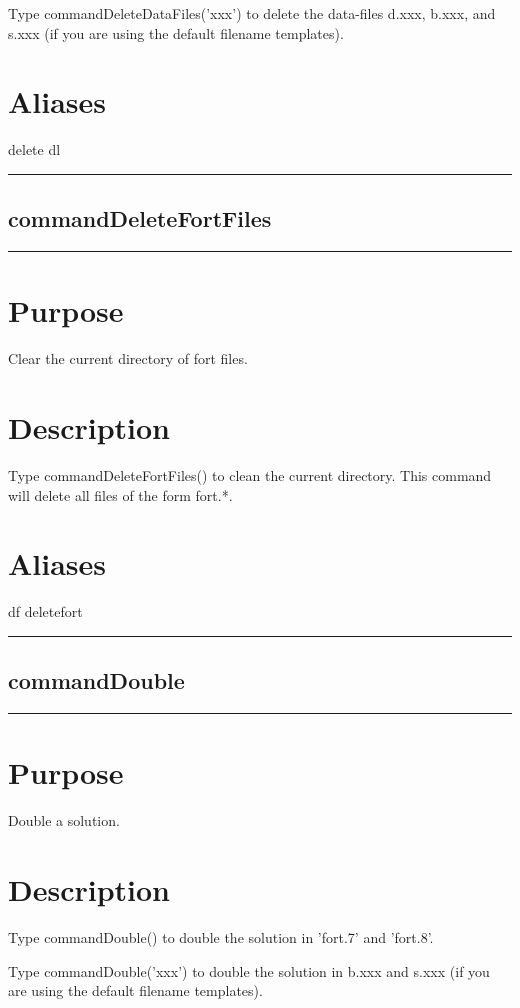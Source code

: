 \documentclass[12pt]{report}
\begin{document}
\begin{minipage}{6in}
    Type commandDeleteDataFiles('xxx') to delete the data-files d.xxx, b.xxx, and s.xxx
    (if you are using the default filename templates).
    \section*{Aliases}
delete dl \medskip\hrule\end{minipage}\subsection{commandDeleteFortFiles} \label{sec:clui_ref_commandDeleteFortFiles}\begin{minipage}{6in}\hrule\medskip\section*{Purpose}
Clear the current directory of fort files.\section*{Description}

    Type commandDeleteFortFiles() to clean the current directory.  This command will
    delete all files of the form fort.*.
    \section*{Aliases}
df deletefort \medskip\hrule\end{minipage}\subsection{commandDouble} \label{sec:clui_ref_commandDouble}\begin{minipage}{6in}\hrule\medskip\section*{Purpose}
Double a solution.\section*{Description}

    Type commandDouble() to double the solution in 'fort.7' and 'fort.8'.

    Type commandDouble('xxx') to double the solution in b.xxx and s.xxx (if you
    are using the default filename templates).

\end{minipage}
\end{document}
